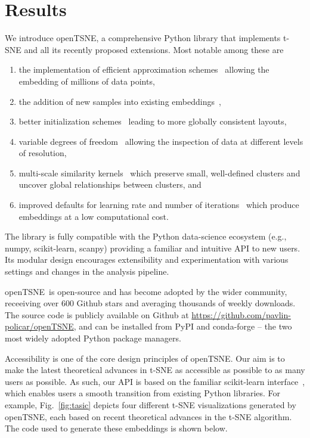 \documentclass[twocolumn]{bmcart}
\newcommand{\opentsne}{\textsf{openTSNE}}
\begin{document}
\section*{Results}

We introduce \opentsne, a comprehensive Python library that implements t-SNE
and all its recently proposed extensions. Most notable among these are
\begin{enumerate}
\item the implementation of efficient approximation 
	schemes~\cite{van2014accelerating,linderman2019fast} allowing the embedding
	of millions of data points,
\item the addition of new samples into existing
	embeddings~\cite{policar2019embedding},
\item better initialization schemes~\cite{kobak2019umap} leading to more
	globally consistent layouts,
\item variable degrees of freedom~\cite{kobak2019heavy} allowing the inspection
	of data at different levels of resolution,
\item multi-scale similarity kernels~\cite{kobak2019art} which preserve small,
	well-defined clusters and uncover global relationships between clusters,
	and
\item improved defaults for learning rate and number of
	iterations~\cite{belkina2019automated} which produce embeddings at a low
	computational cost.
\end{enumerate}

The library is fully compatible with the Python data-science ecosystem (e.g.,
\textsf{numpy}, \textsf{scikit-learn}, \textsf{scanpy}) providing a familiar
and intuitive API to new users. Its modular design encourages
extensibility and experimentation with various settings and changes in the
analysis pipeline.

\opentsne\ is open-source and has become adopted by the wider community,
receeiving over 600 Github stars and averaging thousands of weekly downloads.
The source code is publicly available on Github at
\url{https://github.com/pavlin-policar/openTSNE}, and can be installed from
\textsf{PyPI} and \textsf{conda-forge} -- the two most widely adopted Python
package managers.

Accessibility is one of the core design principles of \opentsne. Our aim is to
make the latest theoretical advances in t-SNE as accessible as possible to as
many users as possible. As such, our API is based on the familiar
\textsf{scikit-learn} interface~\cite{sklearn_api}, which enables users a
smooth transition from existing Python libraries. For example,
Fig.~\ref{fig:tasic} depicts four different t-SNE visualizations generated by
\opentsne, each based on recent theoretical advances in the t-SNE algorithm. The code used
to generate these embeddings is shown below.
\end{document}
